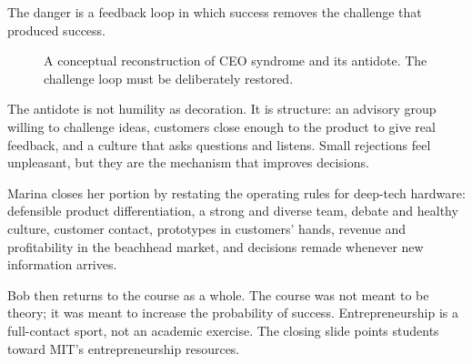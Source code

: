 The danger is a feedback loop in which success removes the challenge that produced success.

\begin{figure}
\centering
{}
\caption{A conceptual reconstruction of CEO syndrome and its antidote. The challenge loop must be deliberately restored.}
\end{figure}

The antidote is not humility as decoration. It is structure: an advisory group willing to challenge ideas, customers close enough to the product to give real feedback, and a culture that asks questions and listens. Small rejections feel unpleasant, but they are the mechanism that improves decisions.

Marina closes her portion by restating the operating rules for deep-tech hardware: defensible product differentiation, a strong and diverse team, debate and healthy culture, customer contact, prototypes in customers' hands, revenue and profitability in the beachhead market, and decisions remade whenever new information arrives.

Bob then returns to the course as a whole. The course was not meant to be theory; it was meant to increase the probability of success. Entrepreneurship is a full-contact sport, not an academic exercise. The closing slide points students toward MIT's entrepreneurship resources.

